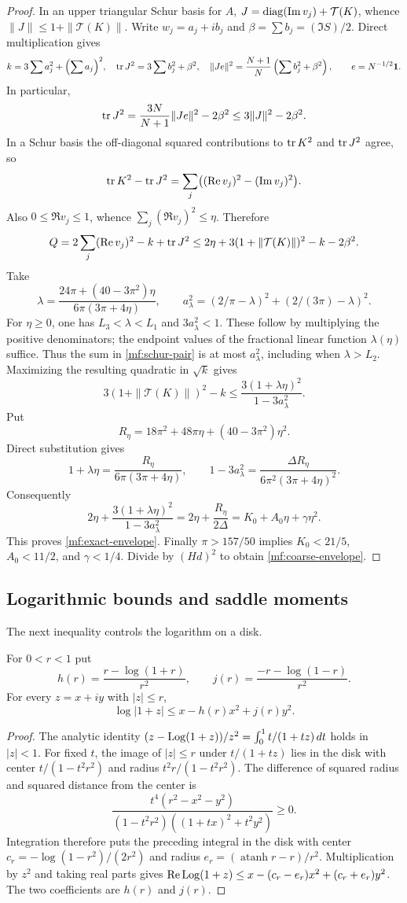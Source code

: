 \begin{proof}
In an upper triangular Schur basis for $A$,
$J=\operatorname{diag}(\operatorname{Im} v_j)+\mathcal T(K)$, whence
$\|J\|\le1+\|\mathcal T(K)\|$. Write $w_j=a_j+ib_j$ and
$\beta=\sum b_j=(\Im S)/2$. Direct multiplication gives
\[
 k=3\sum a_j^2+\Bigl(\sum a_j\Bigr)^2,\quad
 \operatorname{tr} J^2=3\sum b_j^2+\beta^2,\quad
 \|Je\|^2=\frac{N+1}{N}\left(\sum b_j^2+\beta^2\right),
 \qquad e=N^{-1/2}\mathbf1.
\]
In particular,
\[
 \operatorname{tr} J^2=\frac{3N}{N+1}\|Je\|^2-2\beta^2
 \le3\|J\|^2-2\beta^2.
\]
In a Schur basis the off-diagonal squared contributions to
$\operatorname{tr} K^2$ and $\operatorname{tr} J^2$ agree, so
\[
 \operatorname{tr} K^2-\operatorname{tr} J^2
 =\sum_j\bigl((\operatorname{Re} v_j)^2-(\operatorname{Im} v_j)^2\bigr).
\]
Also $0\le\Re v_j\le1$, whence $\sum_j(\Re v_j)^2\le\eta$.
Therefore
\[
 Q=2\sum_j(\operatorname{Re} v_j)^2-k+\operatorname{tr} J^2
 \le2\eta+3(1+\|\mathcal T(K)\|)^2-k-2\beta^2.
\]
Take
\[
 \lambda=\frac{24\pi+(40-3\pi^2)\eta}
                   {6\pi(3\pi+4\eta)},\qquad
 a_\lambda^2=(2/\pi-\lambda)^2+(2/(3\pi)-\lambda)^2.
\]
For $\eta\ge0$, one has $L_3<\lambda<L_1$ and
$3a_\lambda^2<1$. These follow by multiplying the positive
denominators; the endpoint values of the fractional linear
function $\lambda(\eta)$ suffice. Thus the sum in
\eqref{mf:schur-pair} is at most $a_\lambda^2$, including when
$\lambda>L_2$. Maximizing the resulting quadratic in $\sqrt k$
gives
\[
 3(1+\|\mathcal T(K)\|)^2-k
 \le\frac{3(1+\lambda\eta)^2}{1-3a_\lambda^2}.
\]
Put
\[
 R_\eta=18\pi^2+48\pi\eta+(40-3\pi^2)\eta^2.
\]
Direct substitution gives
\[
 1+\lambda\eta=\frac{R_\eta}{6\pi(3\pi+4\eta)},\qquad
 1-3a_\lambda^2
 =\frac{\Delta R_\eta}{6\pi^2(3\pi+4\eta)^2}.
\]
Consequently
\[
 2\eta+\frac{3(1+\lambda\eta)^2}{1-3a_\lambda^2}
 =2\eta+\frac{R_\eta}{2\Delta}
 =K_0+A_0\eta+\gamma\eta^2.
\]
This proves \eqref{mf:exact-envelope}. Finally $\pi>157/50$
implies $K_0<21/5$, $A_0<11/2$, and $\gamma<1/4$.
Divide by $(Hd)^2$ to obtain \eqref{mf:coarse-envelope}.
\end{proof}

\subsection{Logarithmic bounds and saddle moments}

The next inequality controls the logarithm on a disk.

\begin{lemma}\label{mf:log-metric}
For $0<r<1$ put
\[
 h(r)=\frac{r-\log(1+r)}{r^2},\qquad
 j(r)=\frac{-r-\log(1-r)}{r^2}.
\]
For every $z=x+iy$ with $|z|\le r$,
\[
 \log|1+z|\le x-h(r)x^2+j(r)y^2.
\]
\end{lemma}
\begin{proof}
The analytic identity
$(z-\operatorname{Log}(1+z))/z^2=\int_0^1t/(1+tz)\,dt$ holds in $|z|<1$.
For fixed $t$, the image of $|z|\le r$ under $t/(1+tz)$ lies in
the disk with center $t/(1-t^2r^2)$ and radius
$t^2r/(1-t^2r^2)$. The difference of squared radius and squared
distance from the center is
\[
 \frac{t^4(r^2-x^2-y^2)}
 {(1-t^2r^2)((1+tx)^2+t^2y^2)}\ge0.
\]
Integration therefore puts the preceding integral in the disk
with center $c_r=-\log(1-r^2)/(2r^2)$ and radius
$e_r=(\operatorname{atanh}r-r)/r^2$. Multiplication by $z^2$
and taking real parts gives
$\operatorname{Re}\operatorname{Log}(1+z)\le x-(c_r-e_r)x^2+(c_r+e_r)y^2$.
The two coefficients are $h(r)$ and $j(r)$.
\end{proof}

